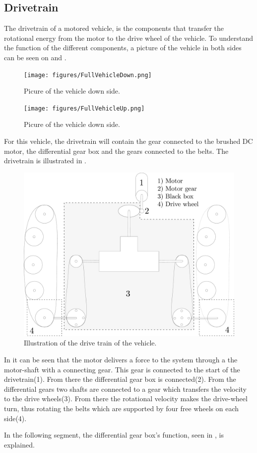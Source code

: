 \subsection{Drivetrain}
The drivetrain of a motored vehicle, is the components that transfer the rotational energy from the motor to the drive wheel of the vehicle. To understand the function of the different components, a picture of the vehicle in both sides can be seen on  and . 

\begin{figure}[H]
	\centering
	\texttt{[image: figures/FullVehicleDown.png]}
	\caption{Picure of the vehicle down side.}
	\label{FullVehicleDown}
\end{figure}

\begin{figure}[H]
	\centering
	\texttt{[image: figures/FullVehicleUp.png]}
	\caption{Picure of the vehicle down side.}
	\label{FullVehicleUp}
\end{figure}


For this vehicle, the drivetrain will contain the gear connected to the brushed DC motor, the differential gear box and the gears connected to the belts. The drivetrain is illustrated in .

\begin{figure}[H]
	\centering
	\includegraphics[scale=.25]{figures/vehicleDescriptionDriveTrain.pdf}
	\caption{Illustration of the drive train of the vehicle.}
	\label{vehicleDescriptionDriveTrain}
\end{figure}

In  it can be seen that the motor delivers a force to the system through a the motor-shaft with a connecting gear. This gear is connected to the start of the drivetrain(1). From there the differential gear box is connected(2). From the differential gears two shafts are connected to a gear which transfers the velocity to the drive wheels(3).
From there the rotational velocity makes the drive-wheel turn, thus rotating the belts which are supported by four free wheels on each side(4). 

In the following segment, the differential gear box's function, seen in , is explained.